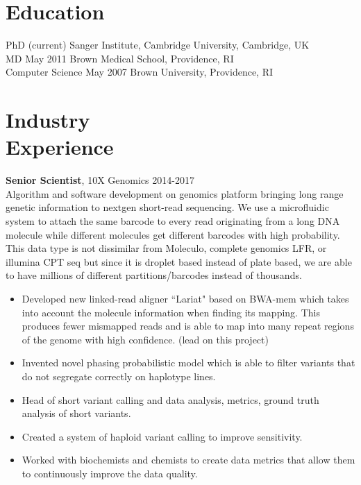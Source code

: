 \documentclass[margin]{res}
\begin{document}
 
\begin{resume} 
\section{Education} 

PhD (current) \hfill Sanger Institute, Cambridge University, Cambridge, UK \\
MD May 2011 \hfill Brown Medical School, Providence, RI \\ 
Computer Science May 2007 \hfill Brown University, Providence, RI 
\section{Industry \\Experience}

{\bf Senior Scientist}, 10X Genomics \hfill 2014-2017 \\
Algorithm and software development on genomics platform bringing long range genetic information to nextgen short-read sequencing. We use a microfluidic system to attach the same barcode to every read originating from a long DNA molecule while different molecules get different barcodes with high probability. This data type is not dissimilar from Moleculo, complete genomics LFR, or illumina CPT seq but since it is droplet based instead of plate based, we are able to have millions of different partitions/barcodes instead of thousands.
\begin{itemize}
\item Developed new linked-read aligner ``Lariat" based on BWA-mem which takes into account the molecule information when finding its mapping. This produces fewer mismapped reads and is able to map into many repeat regions of the genome with high confidence. (lead on this project)
\item Invented novel phasing probabilistic model which is able to filter variants that do not segregate correctly on haplotype lines. 
\item Head of short variant calling and data analysis, metrics, ground truth analysis of short variants.
\item Created a system of haploid variant calling to improve sensitivity. 
\item Worked with biochemists and chemists to create data metrics that allow them to continuously improve the data quality.
\end{itemize}



\end{resume}
\end{document}
